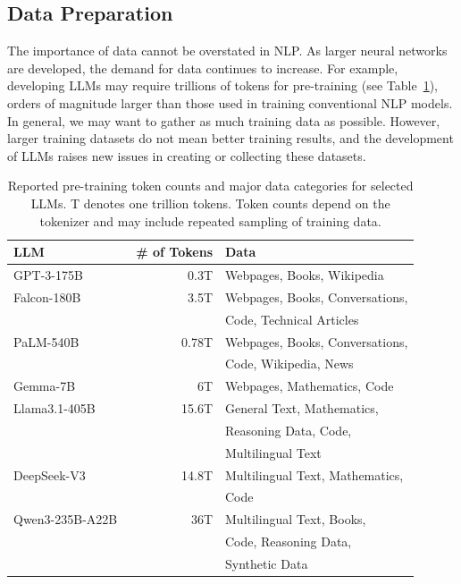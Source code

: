 \subsection{Data Preparation}

\noindent The importance of data cannot be overstated in NLP. As larger neural networks are developed, the demand for data continues to increase. For example, developing LLMs may require trillions of tokens for pre-training (see Table~\ref{tab:training-data-size-llm}), orders of magnitude larger than those used in training conventional NLP models. In general, we may want to gather as much training data as possible. However, larger training datasets do not mean better training results, and the development of LLMs raises new issues in creating or collecting these datasets.

\begin{table}[t]
\centering
\begingroup
\renewcommand{\arraystretch}{1.2}
\begin{tabular}{l | r | l}
LLM & \# of Tokens & Data \\ \hline
GPT-3-175B~\cite{brown-etal:2020language}
& 0.3T & Webpages, Books, Wikipedia \\ \hline
Falcon-180B~\cite{almazrouei-etal:2023falcon}
& 3.5T & Webpages, Books, Conversations, \\
& & Code, Technical Articles \\ \hline
PaLM-540B~\cite{chowdhery-etal:2022palm}
& 0.78T & Webpages, Books, Conversations, \\
& & Code, Wikipedia, News \\ \hline
Gemma-7B~\cite{gemma:24}
& 6T & Webpages, Mathematics, Code \\ \hline
Llama3.1-405B~\cite{dubey2024llama}
& 15.6T & General Text, Mathematics, \\
& & Reasoning Data, Code, \\ 
&  & Multilingual Text \\ \hline
DeepSeek-V3~\cite{liu2024deepseek}
& 14.8T & Multilingual Text, Mathematics,\\
 & &  Code \\ \hline
Qwen3-235B-A22B~\cite{qwen:2025qwen3}
& 36T & Multilingual Text, Books, \\
& & Code, Reasoning Data,  \\
& & Synthetic Data
\end{tabular}
\endgroup
\caption{Reported pre-training token counts and major data categories
for selected LLMs. T denotes one trillion tokens.
Token counts depend on the tokenizer and may include repeated
sampling of training data.}
\label{tab:training-data-size-llm}
\end{table}

